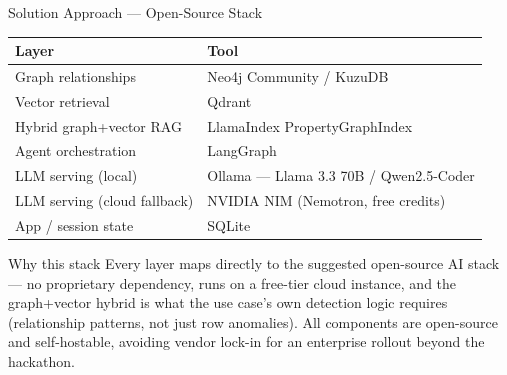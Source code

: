 \documentclass[aspectratio=169]{beamer}
\begin{document}
\begin{frame}{Solution Approach --- Open-Source Stack}
\small
\begin{tabular}{ll}
\textbf{Layer} & \textbf{Tool} \\
\hline
Graph relationships & Neo4j Community / KuzuDB \\
Vector retrieval & Qdrant \\
Hybrid graph+vector RAG & LlamaIndex PropertyGraphIndex \\
Agent orchestration & LangGraph \\
LLM serving (local) & Ollama --- Llama 3.3 70B / Qwen2.5-Coder \\
LLM serving (cloud fallback) & NVIDIA NIM (Nemotron, free credits) \\
App / session state & SQLite \\
\end{tabular}

\vspace{1em}
\begin{block}{Why this stack}
Every layer maps directly to the suggested open-source AI stack --- no proprietary dependency, runs on a free-tier cloud instance, and the graph+vector hybrid is what the use case's own detection logic requires (relationship patterns, not just row anomalies). All components are open-source and self-hostable, avoiding vendor lock-in for an enterprise rollout beyond the hackathon.
\end{block}
\end{frame}
\end{document}
